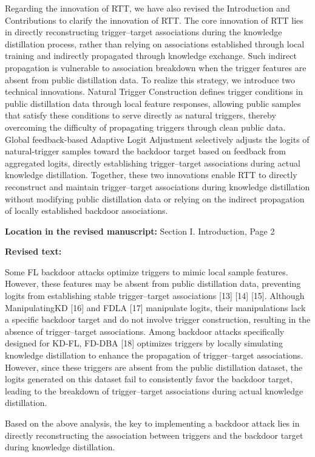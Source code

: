 \documentclass[11pt,a4paper]{article}
\newcommand{\manualindent}{\par\noindent\hspace*{1.5em}\ignorespaces}
\newcommand{\revisedtext}[2]{%
  {\bfseries\color{headingnavy}Location in the revised manuscript:} #1\par
  \begin{tcolorbox}[
      enhanced,breakable,colback=replyblue!3,colframe=replyblue!18,
      before upper={\setlength{\parskip}{6pt}},
      borderline west={2.5pt}{0pt}{replyblue},
      boxrule=0.5pt,arc=1mm,left=11pt,right=9pt,top=8pt,bottom=8pt]
    {\bfseries\color{headingnavy}Revised text:}\par
    #2
  \end{tcolorbox}
  \vspace{0.35em}%
}
\begin{document}
{\manualindent Regarding the innovation of RTT, we have also revised the Introduction and Contributions to clarify the innovation of RTT.
The core innovation of RTT lies in directly reconstructing trigger–target associations during the knowledge distillation process, rather than relying on associations established through local training and indirectly propagated through knowledge exchange. 
Such indirect propagation is vulnerable to association breakdown when the trigger features are absent from public distillation data. 
To realize this strategy, we introduce two technical innovations.
Natural Trigger Construction defines trigger conditions in public distillation data through local feature responses, allowing public samples that satisfy these conditions to serve directly as natural triggers, thereby overcoming the difficulty of propagating triggers through clean public data.
Global feedback-based Adaptive Logit Adjustment selectively adjusts the logits of natural-trigger samples toward the backdoor target based on feedback from aggregated logits, directly establishing trigger--target associations during actual knowledge distillation.
Together, these two innovations enable RTT to directly reconstruct and maintain trigger--target associations during knowledge distillation without modifying public distillation data or relying on the indirect propagation of locally established backdoor associations.}

\revisedtext{Section I. Introduction, Page 2}{\manualindent Some FL backdoor attacks optimize triggers to mimic local sample features. However, these features may be absent from public distillation data, preventing logits from establishing stable trigger--target associations [13] [14] [15].
Although ManipulatingKD [16] and FDLA [17] manipulate logits, their manipulations lack a specific backdoor target and do not involve trigger construction, resulting in the absence of trigger--target associations.
Among backdoor attacks specifically designed for KD-FL, FD-DBA [18] optimizes triggers by locally simulating knowledge distillation to enhance the propagation of trigger--target associations. 
However, since these triggers are absent from the public distillation dataset, the logits generated on this dataset fail to consistently favor the backdoor target, leading to the breakdown of trigger--target associations during actual knowledge distillation.

\manualindent Based on the above analysis, the key to implementing a backdoor attack lies in directly reconstructing the association between triggers and the backdoor target during knowledge distillation.}
\end{document}
